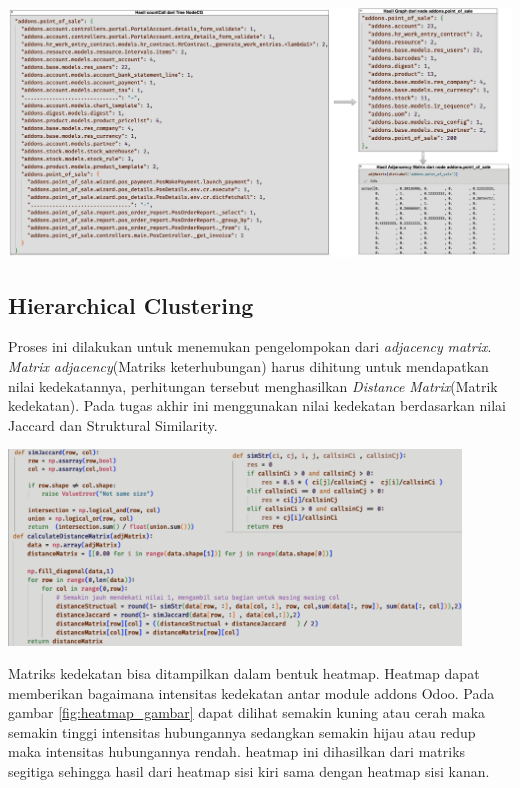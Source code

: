 \begin{center}
	\includegraphics[width=14cm]{img/bab_4/optimisasi_5.png}
	\label{fig:optimasi_5}
\end{center}


\subsection{Hierarchical Clustering}
Proses ini dilakukan untuk menemukan pengelompokan dari \textit{adjacency} \textit{matrix}. \textit{Matrix} \textit{adjacency}(Matriks keterhubungan) harus dihitung untuk mendapatkan nilai kedekatannya, perhitungan tersebut menghasilkan \textit{Distance} \textit{Matrix}(Matrik kedekatan). Pada tugas akhir ini menggunakan nilai kedekatan berdasarkan nilai Jaccard dan Struktural Similarity. 

\begin{center}
	\includegraphics[width=12cm]{img/bab_4/hc_1.png}
	\label{fig:hc_1}
\end{center}

Matriks kedekatan bisa ditampilkan dalam bentuk heatmap. Heatmap dapat memberikan bagaimana intensitas kedekatan antar module addons Odoo. Pada gambar \ref{fig:heatmap_gambar} dapat dilihat semakin kuning atau cerah maka semakin tinggi intensitas hubungannya sedangkan semakin hijau atau redup maka intensitas hubungannya rendah. heatmap ini dihasilkan dari matriks segitiga sehingga hasil dari heatmap sisi kiri sama dengan heatmap sisi kanan.

